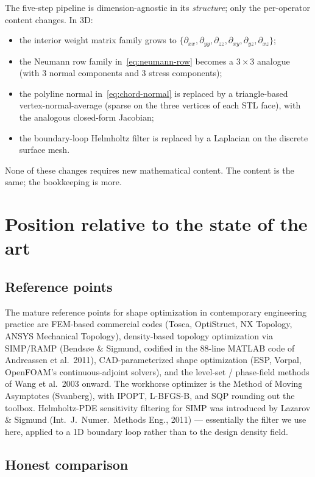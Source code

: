 \documentclass[11pt,a4paper]{article}
\begin{document}
The five-step pipeline is dimension-agnostic in its
\emph{structure}; only the per-operator content changes. In 3D:
\begin{itemize}[leftmargin=2em]
  \item the interior weight matrix family grows to
        $\{\partial_{xx}, \partial_{yy}, \partial_{zz},
        \partial_{xy}, \partial_{yz}, \partial_{xz}\}$;
  \item the Neumann row family in~\eqref{eq:neumann-row}
        becomes a $3 \times 3$ analogue (with 3 normal
        components and 3 stress components);
  \item the polyline normal in~\eqref{eq:chord-normal} is
        replaced by a triangle-based vertex-normal-average
        (sparse on the three vertices of each STL face), with
        the analogous closed-form Jacobian;
  \item the boundary-loop Helmholtz filter is replaced by a
        Laplacian on the discrete surface mesh.
\end{itemize}
None of these changes requires new mathematical content. The
content is the same; the bookkeeping is more.

\section{Position relative to the state of the art}
\label{sec:sota}

\subsection{Reference points}

The mature reference points for shape optimization in
contemporary engineering practice are FEM-based commercial codes
(Tosca, OptiStruct, NX Topology, ANSYS Mechanical Topology),
density-based topology optimization via SIMP/RAMP
(Bendsøe \& Sigmund, codified in the 88-line MATLAB code of
Andreassen et al.\ 2011), CAD-parameterized shape optimization
(ESP, Vorpal, OpenFOAM's continuous-adjoint solvers), and the
level-set / phase-field methods of Wang et al.\ 2003 onward. The
workhorse optimizer is the Method of Moving Asymptotes
(Svanberg), with IPOPT, L-BFGS-B, and SQP rounding out the
toolbox. Helmholtz-PDE sensitivity filtering for SIMP was
introduced by Lazarov \& Sigmund (Int.\ J.\ Numer.\ Methods Eng.,
2011) --- essentially the filter we use here, applied to a 1D
boundary loop rather than to the design density field.

\subsection{Honest comparison}
\end{document}
